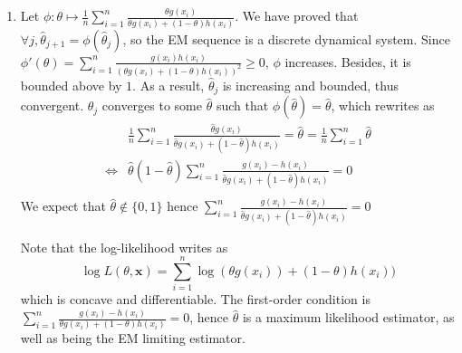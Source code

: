 \documentclass[a4paper,11pt]{article}
\begin{document}
\begin{enumerate}[label=(\alph*)]
  \item Let $\phi:\theta \mapsto \frac 1n \sum_{i=1}^n\frac{\theta g(x_i)}{\theta g(x_i)+ (1-\theta)h(x_i)}$. We have proved that $\forall j, \hat \theta_{j+1} = \phi(\hat \theta_{j})$, so the EM sequence is a discrete dynamical system. Since $\phi'(\theta) = \sum_{i=1}^n \frac{g(x_i)h(x_i)}{(\theta g(x_i)+ (1-\theta)h(x_i))^2}\geq 0$, $\phi$ increases. Besides, it is bounded above by $1$. As a result, $\hat \theta_{j}$ is increasing and bounded, thus convergent.\newline \newline 
  $\hat \theta_{j}$ converges to some $\hat \theta$ such that $\phi(\hat \theta) = \hat \theta$, which rewrites as $$\begin{aligned}
    &\frac 1n \sum_{i=1}^n \frac{\hat \theta g(x_i)}{\hat \theta g(x_i)+ (1-\hat \theta)h(x_i)} = \hat \theta  = \frac 1n \sum_{i=1}^n \hat \theta\\
    \iff& \hat \theta(1-\hat \theta)\sum_{i=1}^n \frac{g(x_i)-h(x_i)}{\hat \theta g(x_i)+ (1-\hat \theta)h(x_i)} = 0 \\
  \end{aligned}$$
  We expect that $\hat \theta \notin \{0,1\}$ hence $\displaystyle \sum_{i=1}^n \frac{g(x_i)-h(x_i)}{\hat\theta g(x_i)+ (1-\hat\theta)h(x_i)} = 0$

  Note that the log-likelihood writes as $$\log L(\theta, \mathbf x) = \sum_{i=1}^n \log(\theta g(x_i)) + (1-\theta)h(x_i))$$ which is concave and differentiable. The first-order condition is $\displaystyle \sum_{i=1}^n \frac{g(x_i)-h(x_i)}{\theta g(x_i) + (1-\theta)h(x_i)} = 0$, hence $\hat \theta$ is a maximum likelihood estimator, as well as being the EM limiting estimator.
\end{enumerate}
\end{document}
